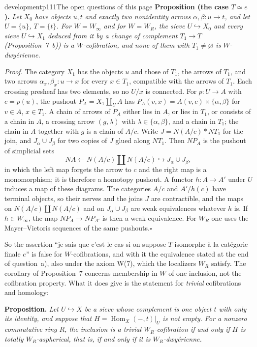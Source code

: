 \begin{dcomment}{development}{p111}{The open questions of this page}
\textbf{Proposition (the case $T\simeq e$).}\ours
\textit{Let $X_0$ have objects $u,t$ and exactly two nonidentity arrows $\alpha,\beta:u\to t$, and let $U=\{u\}$, $T=\{t\}$. For $W=W_\infty$ and for $W=W_R$, the sieve $U\hookrightarrow X_0$ and every sieve $U\hookrightarrow X_1$ deduced from it by a change of complement $T_1\to T$ (Proposition~7~b)) is a $W$-cofibration, and none of them with $T_1\neq\varnothing$ is $W$-dwy\'erienne.}

\textit{Proof.}
The category $X_1$ has the objects $u$ and those of $T_1$, the arrows of $T_1$, and two arrows $\alpha_x,\beta_x:u\to x$ for every $x\in T_1$, compatible with the arrows of $T_1$. Each crossing presheaf has two elements, so no $U/x$ is connected. For $p:U\to A$ with $c=p(u)$, the pushout $P_A=X_1\amalg_UA$ has $P_A(v,x)=A(v,c)\times\{\alpha,\beta\}$ for $v\in A$, $x\in T_1$. A chain of arrows of $P_A$ either lies in $A$, or lies in $T_1$, or consists of a chain in $A$, a crossing arrow $(g,\lambda)$ with $\lambda\in\{\alpha,\beta\}$, and a chain in $T_1$; the chain in $A$ together with $g$ is a chain of $A/c$. Write $J=N(A/c)*NT_1$ for the join, and $J_\alpha\cup J_\beta$ for two copies of $J$ glued along $NT_1$. Then $NP_A$ is the pushout of simplicial sets
\[
 NA\longleftarrow N(A/c)\amalg N(A/c)\hookrightarrow J_\alpha\cup J_\beta ,
\]
in which the left map forgets the arrow to $c$ and the right map is a monomorphism; it is therefore a homotopy pushout. A functor $h:A\to A'$ under $U$ induces a map of these diagrams. The categories $A/c$ and $A'/h(c)$ have terminal objects, so their nerves and the joins $J$ are contractible, and the maps on $N(A/c)\amalg N(A/c)$ and on $J_\alpha\cup J_\beta$ are weak equivalences whatever $h$ is. If $h\in W_\infty$, the map $NP_A\to NP_{A'}$ is then a weak equivalence. For $W_R$ one uses the Mayer--Vietoris sequences of the same pushouts.\hfill$\square$

So the assertion ``je sais que c'est le cas si on suppose $T$ isomorphe \`a la cat\'egorie finale $e$'' is false for $W$-cofibrations, and with it the equivalence stated at the end of question~a), also under the axiom W(7), which the localizers $W_R$ satisfy. The corollary of Proposition~7 concerns membership in $W$ of one inclusion, not the cofibration property. What it does give is the statement for \emph{trivial} cofibrations and homology:

\textbf{Proposition.}\ours
\textit{Let $U\hookrightarrow X$ be a sieve whose complement is one object $t$ with only its identity, and suppose that $H=\operatorname{Hom}_X(-,t)|_U$ is not empty. For a nonzero commutative ring $R$, the inclusion is a trivial $W_R$-cofibration if and only if $H$ is totally $W_R$-aspherical, that is, if and only if it is $W_R$-dwy\'erienne.}


\end{dcomment}
